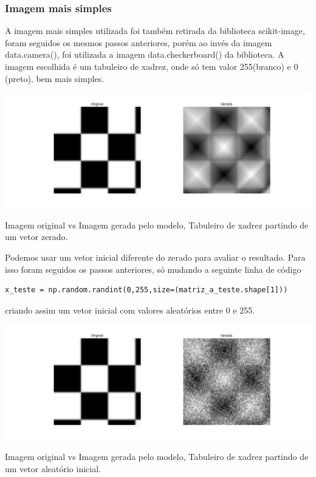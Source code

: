 \documentclass[a4paper, 12pt]{article}
\begin{document}
\subsubsection{Imagem mais simples}

A imagem mais simples utilizada foi também retirada da biblioteca scikit-image, foram seguidos os mesmos passos anteriores, porém ao invés da imagem data.camera(), foi utilizada a imagem data.checkerboard() da biblioteca. A imagem escolhida é um tabuleiro de xadrez, onde só tem valor 255(branco) e 0 (preto), bem mais simples.

\begin{center}
    
\includegraphics[width=16cm]{14_xadrez80_vetor0.png}

Imagem original vs Imagem gerada pelo modelo, Tabuleiro de xadrez partindo de um vetor zerado.  
    
\end{center}

\begin{center}
    
Podemos usar um vetor inicial diferente do zerado para avaliar o resultado.
Para isso foram seguidos os passos anteriores, só mudando a seguinte linha de código
\begin{lstlisting}
x_teste = np.random.randint(0,255,size=(matriz_a_teste.shape[1]))
\end{lstlisting}
criando assim um vetor inicial com valores aleatórios entre 0 e 255.

\includegraphics[width=16cm]{15_xadrez80_vetor_Aleatorio.png}

Imagem original vs Imagem gerada pelo modelo, Tabuleiro de xadrez partindo de um vetor aleatório inicial.   
    
\end{center}
\end{document}
